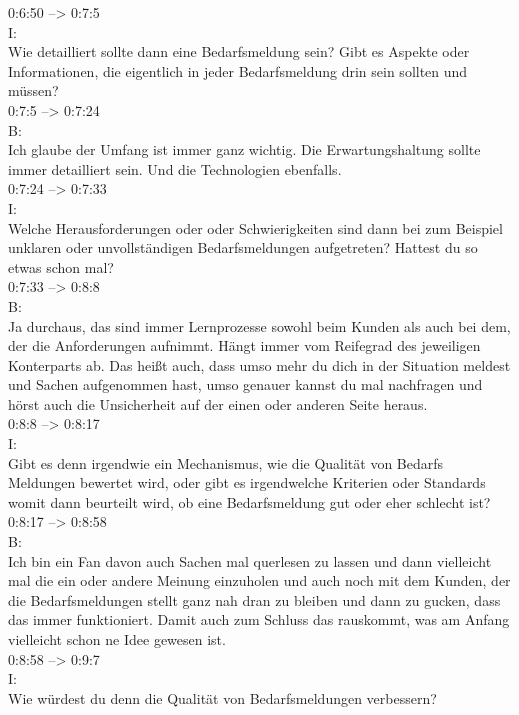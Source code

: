 0:6:50 --> 0:7:5\\
I:\\
Wie detailliert sollte dann eine Bedarfsmeldung sein? Gibt es Aspekte oder Informationen, die eigentlich in jeder Bedarfsmeldung drin sein sollten und müssen?\\

0:7:5 --> 0:7:24\\
B:\\
Ich glaube der Umfang ist immer ganz wichtig. Die Erwartungshaltung sollte immer detailliert sein. Und die Technologien ebenfalls.\\

0:7:24 --> 0:7:33\\
I:\\
Welche Herausforderungen oder oder Schwierigkeiten sind dann bei zum Beispiel unklaren oder unvollständigen Bedarfsmeldungen aufgetreten? Hattest du so etwas schon mal?\\

0:7:33 --> 0:8:8\\
B:\\
Ja durchaus, das sind immer Lernprozesse sowohl beim Kunden als auch bei dem, der die Anforderungen aufnimmt. Hängt immer vom Reifegrad des jeweiligen Konterparts ab. Das heißt auch, dass umso mehr du dich in der Situation meldest und Sachen aufgenommen hast, umso genauer kannst du mal nachfragen und hörst auch die Unsicherheit auf der einen oder anderen Seite heraus.\\

0:8:8 --> 0:8:17\\
I:\\
Gibt es denn irgendwie ein Mechanismus, wie die Qualität von Bedarfs Meldungen bewertet wird, oder gibt es irgendwelche Kriterien oder Standards womit dann beurteilt wird, ob eine Bedarfsmeldung gut oder eher schlecht ist?\\

0:8:17 --> 0:8:58\\
B:\\
Ich bin ein Fan davon auch Sachen mal querlesen zu lassen und dann vielleicht mal die ein oder andere Meinung einzuholen und auch noch mit dem Kunden, der die Bedarfsmeldungen stellt ganz nah dran zu bleiben und dann zu gucken, dass das immer funktioniert. Damit auch zum Schluss das rauskommt, was am Anfang vielleicht schon ne Idee gewesen ist.\\

0:8:58 --> 0:9:7\\
I:\\
Wie würdest du denn die Qualität von Bedarfsmeldungen verbessern?\\

